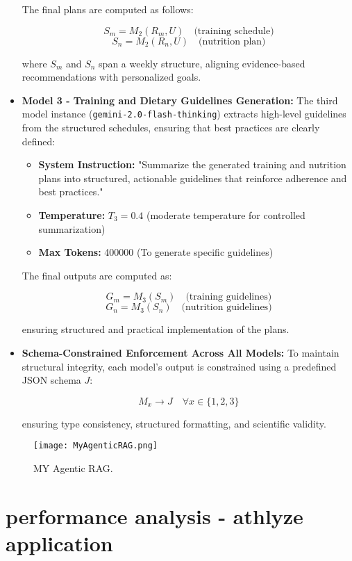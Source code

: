 \documentclass[conference]{IEEEtran}
\begin{document}
\begin{itemize}
    The final plans are computed as follows:

    \[
    S_m = M_2(R_m, U) \quad \text{(training schedule)}
    \]
    \[
    S_n = M_2(R_n, U) \quad \text{(nutrition plan)}
    \]

    where $S_m$ and $S_n$ span a weekly structure, aligning evidence-based recommendations with personalized goals.

    \item \textbf{Model 3 - Training and Dietary Guidelines Generation:}  
    The third model instance (\texttt{gemini-2.0-flash-thinking}) extracts high-level guidelines from the structured schedules, ensuring that best practices are clearly defined:

    \begin{itemize}
        \item \textbf{System Instruction:} "Summarize the generated training and nutrition plans into structured, actionable guidelines that reinforce adherence and best practices."
        \item \textbf{Temperature:} $T_3 = 0.4$ (moderate temperature for controlled summarization)
        \item \textbf{Max Tokens:} 400000 (To generate specific guidelines)
    \end{itemize}

    The final outputs are computed as:

    \[
    G_m = M_3(S_m) \quad \text{(training guidelines)}
    \]
    \[
    G_n = M_3(S_n) \quad \text{(nutrition guidelines)}
    \]

    ensuring structured and practical implementation of the plans.

    \item \textbf{Schema-Constrained Enforcement Across All Models:}  
    To maintain structural integrity, each model's output is constrained using a predefined JSON schema $J$:

    \[
    M_x \rightarrow J \quad \forall x \in \{1, 2, 3\}
    \]

    ensuring type consistency, structured formatting, and scientific validity.
\end{itemize}

\begin{figure}[h!]
    \centering
    \texttt{[image: MyAgenticRAG.png]}
    \caption{MY Agentic RAG.}
    \label{fig:RAG}
\end{figure}

\section{performance analysis - athlyze application}
\end{document}
